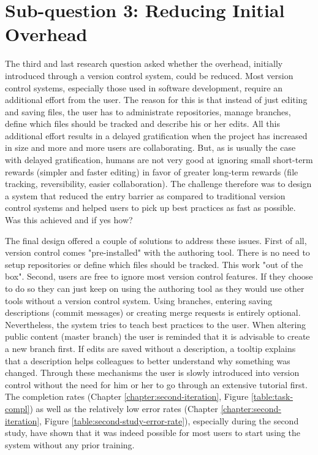 \section{Sub-question 3: Reducing Initial Overhead}
The third and last research question asked whether the overhead, initially introduced through a version control system, could be reduced. Most version control systems, especially those used in software development, require an additional effort from the user. The reason for this is that instead of just editing and saving files, the user has to administrate repositories, manage branches, define which files should be tracked and describe his or her edits. All this additional effort results in a delayed gratification when the project has increased in size and more and more users are collaborating. But, as is usually the case with delayed gratification, humans are not very good at ignoring small short-term rewards (simpler and faster editing) in favor of greater long-term rewards (file tracking, reversibility, easier collaboration). The challenge therefore was to design a system that reduced the entry barrier as compared to traditional version control systems and helped users to pick up best practices as fast as possible. Was this achieved and if yes how?

The final design offered a couple of solutions to address these issues. First of all, version control comes "pre-installed" with the authoring tool. There is no need to setup repositories or define which files should be tracked. This work "out of the box". Second, users are free to ignore most version control features. If they choose to do so they can just keep on using the authoring tool as they would use other tools without a version control system. Using branches, entering saving descriptions (commit messages) or creating merge requests is entirely optional. Nevertheless, the system tries to teach best practices to the user. When altering public content (master branch) the user is reminded that it is advisable to create a new branch first. If edits are saved without a description, a tooltip explains that a description helps colleagues to better understand why something was changed. Through these mechanisms the user is slowly introduced into version control without the need for him or her to go through an extensive tutorial first. The completion rates (Chapter \ref{chapter:second-iteration}, Figure \ref{table:task-compl}) as well as the relatively low error rates (Chapter \ref{chapter:second-iteration}, Figure \ref{table:second-study-error-rate}), especially during the second study, have shown that it was indeed possible for most users to start using the system without any prior training.

